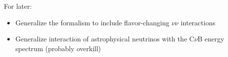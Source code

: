 \documentclass[aps,twocolumn,prd,showpacs,showkeys,preprintnumbers,superscriptaddress,nobibnotes,floatfix,longbibliography]{revtex4-1}
\begin{document}
For later:
\begin{itemize}
 \item
  Generalize the formalism to include flavor-changing $\nu \nu$ interactions
 \item
  Generalize interaction of astrophysical neutrinos with the C$\nu$B energy spectrum (probably overkill)  
\end{itemize}





\end{document}
